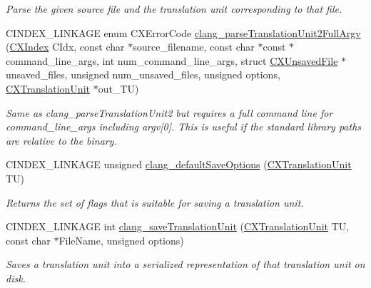 \begin{DoxyCompactItemize}
\begin{DoxyCompactList}\small\item\em Parse the given source file and the translation unit corresponding to that file. \end{DoxyCompactList}\item 
\mbox{\label{group__CINDEX__TRANSLATION__UNIT_ga1270c19516b75bac85797ebb837c64e1}} 
C\+I\+N\+D\+E\+X\+\_\+\+L\+I\+N\+K\+A\+GE enum C\+X\+Error\+Code \hyperlink{group__CINDEX__TRANSLATION__UNIT_ga1270c19516b75bac85797ebb837c64e1}{clang\+\_\+parse\+Translation\+Unit2\+Full\+Argv} (\hyperlink{group__CINDEX_gae039c2574bfd75774ca7a9a3e55910cb}{C\+X\+Index} C\+Idx, const char $\ast$source\+\_\+filename, const char $\ast$const $\ast$command\+\_\+line\+\_\+args, int num\+\_\+command\+\_\+line\+\_\+args, struct \hyperlink{structCXUnsavedFile}{C\+X\+Unsaved\+File} $\ast$unsaved\+\_\+files, unsigned num\+\_\+unsaved\+\_\+files, unsigned options, \hyperlink{group__CINDEX_gacdb7815736ca709ce9a5e1ec2b7e16ac}{C\+X\+Translation\+Unit} $\ast$out\+\_\+\+TU)
\begin{DoxyCompactList}\small\item\em Same as clang\+\_\+parse\+Translation\+Unit2 but requires a full command line for {\ttfamily command\+\_\+line\+\_\+args} including argv\mbox{[}0\mbox{]}. This is useful if the standard library paths are relative to the binary. \end{DoxyCompactList}\item 
C\+I\+N\+D\+E\+X\+\_\+\+L\+I\+N\+K\+A\+GE unsigned \hyperlink{group__CINDEX__TRANSLATION__UNIT_ga4cb02bd2ceed0380a761391ba7a69092}{clang\+\_\+default\+Save\+Options} (\hyperlink{group__CINDEX_gacdb7815736ca709ce9a5e1ec2b7e16ac}{C\+X\+Translation\+Unit} TU)
\begin{DoxyCompactList}\small\item\em Returns the set of flags that is suitable for saving a translation unit. \end{DoxyCompactList}\item 
C\+I\+N\+D\+E\+X\+\_\+\+L\+I\+N\+K\+A\+GE int \hyperlink{group__CINDEX__TRANSLATION__UNIT_ga3abe9df81f9fef269d737d82720c1d33}{clang\+\_\+save\+Translation\+Unit} (\hyperlink{group__CINDEX_gacdb7815736ca709ce9a5e1ec2b7e16ac}{C\+X\+Translation\+Unit} TU, const char $\ast$File\+Name, unsigned options)
\begin{DoxyCompactList}\small\item\em Saves a translation unit into a serialized representation of that translation unit on disk. \end{DoxyCompactList}\item 

\end{DoxyCompactItemize}
